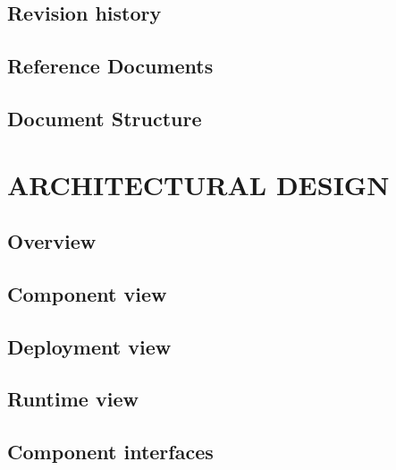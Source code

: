 \documentclass[11pt]{report}
\begin{document}
		\section{Revision history}
		\label{sect:Revision history}
			
			
		\section{Reference Documents}
		\label{sect:Documents}
			
			
		\section{Document Structure}
		\label{sect:Document Structure}
			
	\chapter{ARCHITECTURAL DESIGN}
	\label{ch:ARCHITECTURAL DESIGN}
	
		\section{Overview}
		\label{sect:Overview}
			
			
		\section{Component view}
		\label{sect:Component view}
			
			
		\section{Deployment view}
		\label{sect:Deployment view}
			
			
		\section{Runtime view}
		\label{sect:Runtime view}
			
		\section{Component interfaces}
		\label{sect:Component interfaces}
		
\end{document}

